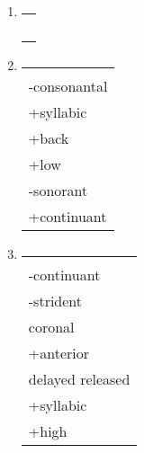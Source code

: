 \documentclass{article}
\newcommand{\rulealign}[1]{
    \begin{tabular}[t]{l}
      \\
      #1
    \end{tabular}
  }
\begin{document}
\begin{enumerate}
\begin{enumerate}
{      }
      \item \rulealign{
        \phonr{\phonfeat[l]{+consonantal} \\ \oneof[l]{\phonfeat[l]{labial} \\ \phonfeat[l]{dorsal} \\ \phonfeat[l]{pharyngeal} \\ \phonfeat[l]{laryngeal}}}{ø}{\#}
      }
      \item \rulealign{
        \phonr{\phonfeat[l]{$\alpha$round \\ -consonantal \\ +syllabic}}{\phonfeat[l]{$\alpha$round \\ +back \\ +low}}{\phonfeat[l]{pharyngeal \\ -sonorant \\ +continuant}}
      }
      \item \rulealign{
        \phonr{\phonfeat[l]{-sonorant \\ -continuant \\ -strident \\ coronal \\ +anterior}}{\phonfeat[l]{+strident \\ delayed released}}{\phonfeat[l]{-consonantal \\ +syllabic \\ +high}}
      }
    \end{enumerate}
  \end{enumerate}
\end{document}
